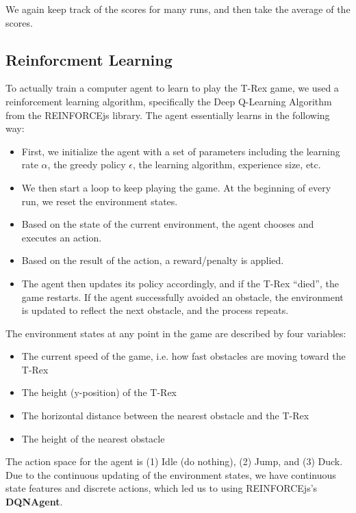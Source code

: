 \documentclass{scrartcl}
\begin{document}
    We again keep track of the scores for many runs, and then take the average of the scores.

    \subsection{Reinforcment Learning}\label{ssec:RL}
    To actually train a computer agent to learn to play the T-Rex game, we used a reinforcement
    learning algorithm, specifically the Deep Q-Learning Algorithm from the REINFORCEjs library.
    The agent essentially learns in the following way:

    \begin{itemize}
        \item First, we initialize the agent with a set of parameters including the learning rate $\alpha$, the greedy policy $\epsilon$, the learning algorithm, experience size, etc.
        \item We then start a loop to keep playing the game. At the beginning of every run, we reset the environment states.
        \item Based on the state of the current environment, the agent chooses and executes an action.
        \item Based on the result of the action, a reward/penalty is applied.
        \item The agent then updates its policy accordingly, and if the T-Rex ``died'', the game restarts. If the agent successfully avoided an obstacle, the environment is updated to reflect the next obstacle, and the process repeats.
    \end{itemize}

    The environment states at any point in the game are described by four variables:
    \begin{itemize}
        \item The current speed of the game, i.e. how fast obstacles are moving toward the T-Rex
        \item The height (y-position) of the T-Rex
        \item The horizontal distance between the nearest obstacle and the T-Rex
        \item The height of the nearest obstacle
    \end{itemize}

    The action space for the agent is (1) Idle (do nothing), (2) Jump, and (3)
    Duck. Due to the continuous updating of the environment states, we have
    continuous state features and discrete actions, which led us to using
    REINFORCEjs's \textbf{DQNAgent}.
\end{document}
